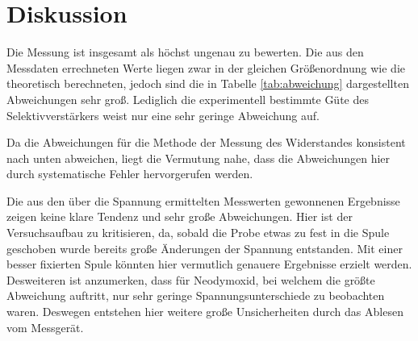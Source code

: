 \section{Diskussion}
\label{sec:Diskussion}



Die Messung ist insgesamt als höchst ungenau zu bewerten. Die aus den Messdaten errechneten
Werte liegen zwar in der gleichen Größenordnung wie die theoretisch berechneten,
jedoch sind die in Tabelle \ref{tab:abweichung} dargestellten Abweichungen sehr groß.
Lediglich die experimentell bestimmte Güte des Selektivverstärkers weist nur eine
sehr geringe Abweichung auf.

Da die Abweichungen für die Methode der Messung des Widerstandes konsistent nach
unten abweichen, liegt die Vermutung nahe, dass die Abweichungen hier durch
systematische Fehler hervorgerufen werden.

Die aus den über die Spannung ermittelten Messwerten gewonnenen Ergebnisse zeigen
keine klare Tendenz und sehr große Abweichungen. Hier ist der Versuchsaufbau zu
kritisieren, da, sobald die Probe etwas zu fest in die Spule geschoben wurde bereits
große Änderungen der Spannung entstanden. Mit einer besser fixierten Spule könnten
hier vermutlich genauere Ergebnisse erzielt werden. Desweiteren ist anzumerken,
dass für Neodymoxid, bei welchem die größte Abweichung auftritt, nur sehr
geringe Spannungsunterschiede zu beobachten waren. Deswegen entstehen hier weitere
große Unsicherheiten durch das Ablesen vom Messgerät.
